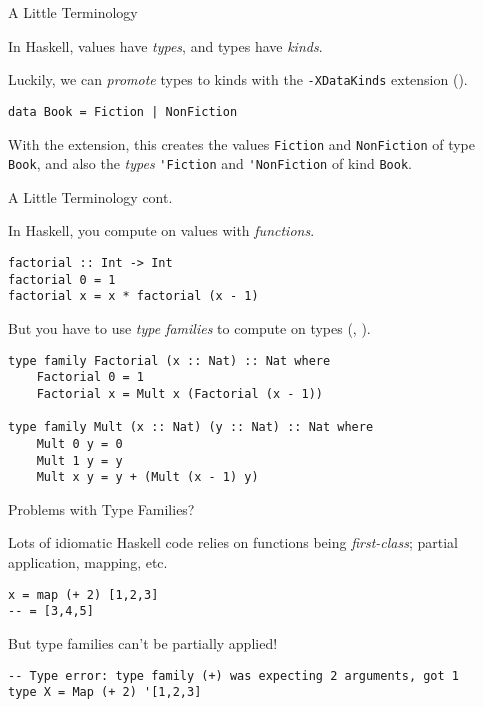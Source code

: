 \documentclass{beamer}
\newcommand{\inline}[1]{\lstinline[basicstyle=\ttfamily]{#1}}
\begin{document}
\begin{frame}[fragile]{A Little Terminology}

In Haskell, values have \emph{types}, and types have \emph{kinds}.

\pause

Luckily, we can \emph{promote} types to kinds with the \inline{-XDataKinds} extension (\cite{givingpromotion}).

\pause

\begin{lstlisting}
data Book = Fiction | NonFiction
\end{lstlisting}

With the extension, this creates the values \inline{Fiction} and \inline{NonFiction} of type \inline{Book}, and also the \emph{types} \inline{'Fiction} and \inline{'NonFiction} of kind \inline{Book}.

\end{frame}

\begin{frame}[fragile]{A Little Terminology cont.}

In Haskell, you compute on values with \emph{functions}.

\begin{lstlisting}
factorial :: Int -> Int
factorial 0 = 1
factorial x = x * factorial (x - 1)
\end{lstlisting}

\pause

But you have to use \emph{type families} to compute on types (\cite{opentfs}, \cite{closedtfs}).

\begin{lstlisting}
type family Factorial (x :: Nat) :: Nat where
    Factorial 0 = 1
    Factorial x = Mult x (Factorial (x - 1))
    
type family Mult (x :: Nat) (y :: Nat) :: Nat where
    Mult 0 y = 0
    Mult 1 y = y
    Mult x y = y + (Mult (x - 1) y)
\end{lstlisting}

\end{frame}

\begin{frame}[fragile]{Problems with Type Families?}

Lots of idiomatic Haskell code relies on functions being \emph{first-class}; partial application, mapping, etc.

\begin{lstlisting}
x = map (+ 2) [1,2,3]
-- = [3,4,5]
\end{lstlisting}

\pause

But type families can't be partially applied!

\begin{lstlisting}
-- Type error: type family (+) was expecting 2 arguments, got 1
type X = Map (+ 2) '[1,2,3]
\end{lstlisting}
    
\end{frame}
\end{document}
